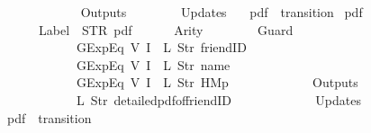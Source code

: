 \begin{isabellebody}
\ \ \ \ \ \ {\isacharbrackright}{\isacharcomma}\isanewline
\ \ \ \ \ \ Outputs\ {\isacharequal}\ {\isacharbrackleft}{\isacharbrackright}{\isacharcomma}\isanewline
\ \ \ \ \ \ Updates\ {\isacharequal}\ {\isacharbrackleft}{\isacharbrackright}\isanewline
{\isasymrparr}{\isachardoublequoteclose}\isanewline
\isanewline
{}\isamarkupfalse%
\ {\isachardoublequoteopen}pdf{\isachardoublequoteclose}\ {\isacharcolon}{\isacharcolon}\ {\isachardoublequoteopen}transition{\isachardoublequoteclose}\ \isanewline
{\isachardoublequoteopen}pdf\ {\isasymequiv}\ {\isasymlparr}\isanewline
\ \ \ \ \ \ Label\ {\isacharequal}\ STR\ {\isacharprime}{\isacharprime}pdf{\isacharprime}{\isacharprime}{\isacharcomma}\isanewline
\ \ \ \ \ \ Arity\ {\isacharequal}\ {}{\isacharcomma}\isanewline
\ \ \ \ \ \ Guard\ {\isacharequal}\ {\isacharbrackleft}\isanewline
\ \ \ \ \ \ \ \ \ \ \ \ GExp{\isachardot}Eq\ {\isacharparenleft}V\ {\isacharparenleft}I\ {}{\isacharparenright}{\isacharparenright}\ {\isacharparenleft}L\ {\isacharparenleft}Str\ {\isacharprime}{\isacharprime}friendID{\isacharprime}{\isacharprime}{\isacharparenright}{\isacharparenright}{\isacharcomma}\isanewline
\ \ \ \ \ \ \ \ \ \ \ \ GExp{\isachardot}Eq\ {\isacharparenleft}V\ {\isacharparenleft}I\ {}{\isacharparenright}{\isacharparenright}\ {\isacharparenleft}L\ {\isacharparenleft}Str\ {\isacharprime}{\isacharprime}name{\isacharprime}{\isacharprime}{\isacharparenright}{\isacharparenright}{\isacharcomma}\isanewline
\ \ \ \ \ \ \ \ \ \ \ \ GExp{\isachardot}Eq\ {\isacharparenleft}V\ {\isacharparenleft}I\ {}{\isacharparenright}{\isacharparenright}\ {\isacharparenleft}L\ {\isacharparenleft}Str\ {\isacharprime}{\isacharprime}HM{}p{\isacharprime}{\isacharprime}{\isacharparenright}{\isacharparenright}\isanewline
\ \ \ \ \ \ {\isacharbrackright}{\isacharcomma}\isanewline
\ \ \ \ \ \ Outputs\ {\isacharequal}\ {\isacharbrackleft}\isanewline
\ \ \ \ \ \ \ \ \ \ \ \ {\isacharparenleft}L\ {\isacharparenleft}Str\ {\isacharprime}{\isacharprime}detailed{\isacharunderscore}pdf{\isacharunderscore}of{\isacharunderscore}friendID{\isacharprime}{\isacharprime}{\isacharparenright}{\isacharparenright}\isanewline
\ \ \ \ \ \ {\isacharbrackright}{\isacharcomma}\isanewline
\ \ \ \ \ \ Updates\ {\isacharequal}\ {\isacharbrackleft}{\isacharbrackright}\isanewline
{\isasymrparr}{\isachardoublequoteclose}\isanewline
\isanewline
{}\isamarkupfalse%
\ {\isachardoublequoteopen}pdf{}{\isachardoublequoteclose}\ {\isacharcolon}{\isacharcolon}\ {\isachardoublequoteopen}transition{\isachardoublequoteclose}\ \isanewline

\end{isabellebody}
